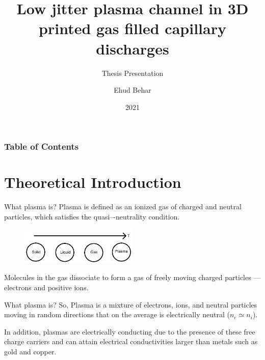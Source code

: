 \documentclass[draft]{beamer}
\title{Low jitter plasma channel in 3D printed gas filled capillary discharges}
\subtitle{Thesis Presentation}
\author{Ehud Behar}
\institute{Hebrew University of Jerusalem}
\date{2021}
\begin{document}
\frame{\titlepage}
\begin{frame}
\frametitle{Table of Contents}
\tableofcontents
\end{frame}

\section{Theoretical Introduction}
\newcommand{\whatisplasma}{What plasma is?}
\begin{frame}{\whatisplasma}
Plasma is defined as an ionized gas of charged and neutral particles, which  satisfies  the quasi–-neutrality condition.
\begin{figure}
    \centering
    \includegraphics[width=0.5\textwidth]{figures/temp_and_states.png}
\end{figure}
Molecules in the gas dissociate to form a gas of freely moving charged particles --- electrons and positive ions.
\end{frame}
\begin{frame}{\whatisplasma}
So, Plasma is a mixture of electrons, ions, and neutral particles moving in random directions that on the average is electrically neutral ($n_e \simeq n_i$).

In addition, plasmas are electrically conducting due to the presence of these free charge carriers and can attain electrical conductivities larger than metals such as gold and copper.
\end{frame}
\end{document}
